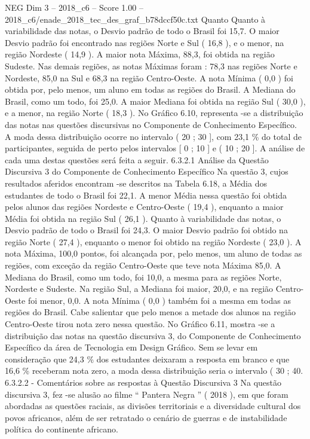 \begin{textsample}{NEG Dim 3 – 2018\_c6 – Score 1.00 – 2018\_c6/enade\_2018\_tec\_des\_graf\_b78dccf50c.txt}
Quanto Quanto à variabilidade das notas, o Desvio padrão de todo o Brasil foi 15,7.
O maior Desvio padrão foi encontrado nas regiões Norte e Sul ( 16,8 ), e o menor, na região Nordeste ( 14,9 ).
A maior nota Máxima, 88,3, foi obtida na região Sudeste.
Nas demais regiões, as notas Máximas foram : 78,3 nas regiões Norte e Nordeste, 85,0 na Sul e 68,3 na região Centro-Oeste.
A nota Mínima ( 0,0 ) foi obtida por, pelo menos, um aluno em todas as regiões do Brasil.
A Mediana do Brasil, como um todo, foi 25,0.
A maior Mediana foi obtida na região Sul ( 30,0 ), e a menor, na região Norte ( 18,3 ).
No Gráfico 6.10, representa -se a distribuição das notas nas questões discursivas no Componente de Conhecimento Específico.
A moda dessa distribuição ocorre no intervalo ( 20 ; 30 ], com 23,1 \% do total de participantes, seguida de perto pelos intervalos [ 0 ; 10 ] e ( 10 ; 20 ].
A análise de cada uma destas questões será feita a seguir. 6.3.2.1 Análise da Questão Discursiva 3 do Componente de Conhecimento Específico Na questão 3, cujos resultados aferidos encontram -se descritos na Tabela 6.18, a Média dos estudantes de todo o Brasil foi 22,1.
A menor Média nessa questão foi obtida pelos alunos das regiões Nordeste e Centro-Oeste ( 19,4 ), enquanto a maior Média foi obtida na região Sul ( 26,1 ).
Quanto à variabilidade das notas, o Desvio padrão de todo o Brasil foi 24,3.
O maior Desvio padrão foi obtido na região Norte ( 27,4 ), enquanto o menor foi obtido na região Nordeste ( 23,0 ).
A nota Máxima, 100,0 pontos, foi alcançada por, pelo menos, um aluno de todas as regiões, com exceção da região Centro-Oeste que teve nota Máxima 85,0.
A Mediana do Brasil, como um todo, foi 10,0, a mesma para as regiões Norte, Nordeste e Sudeste.
Na região Sul, a Mediana foi maior, 20,0, e na região Centro-Oeste foi menor, 0,0.
A nota Mínima ( 0,0 ) também foi a mesma em todas as regiões do Brasil.
Cabe salientar que pelo menos a metade dos alunos na região Centro-Oeste tirou nota zero nessa questão.
No Gráfico 6.11, mostra -se a distribuição das notas na questão discursiva 3, do Componente de Conhecimento Específico da área de Tecnologia em Design Gráfico.
Sem se levar em consideração que 24,3 \% dos estudantes deixaram a resposta em branco e que 16,6 \% receberam nota zero, a moda dessa distribuição seria o intervalo ( 30 ; 40. 6.3.2.2 - Comentários sobre as respostas à Questão Discursiva 3 Na questão discursiva 3, fez -se alusão ao filme “ Pantera Negra ” ( 2018 ), em que foram abordadas as questões raciais, as divisões territoriais e a diversidade cultural dos povos africanos, além de ser retratado o cenário de guerras e de instabilidade política do continente africano.

\end{textsample}
